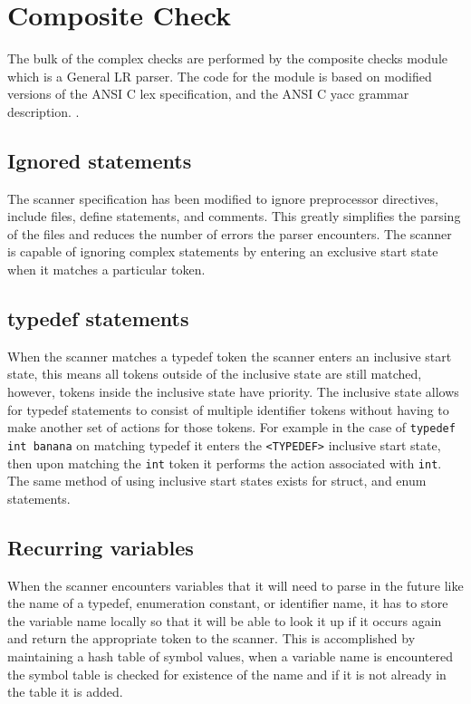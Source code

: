 \section{Composite Check}

The bulk of the complex checks are performed by the composite checks module 
which is a General LR parser. The code for the module is based on modified 
versions of the ANSI C lex specification, and the ANSI C yacc grammar 
description. \citep{ANSI}.

\subsection{Ignored statements}
The scanner specification has been modified to 
ignore preprocessor directives, include files, define statements, and comments.
This greatly simplifies the parsing of the files and reduces the number of 
errors the parser encounters. The scanner is capable of ignoring complex 
statements by entering an exclusive start state when it matches a particular
token.

\subsection{typedef statements}
When the scanner matches a typedef token the scanner enters an inclusive start
state, this means all tokens outside of the inclusive state are still matched,
however, tokens inside the inclusive state have priority. The inclusive state 
allows for typedef statements to consist of multiple identifier tokens without 
having to make another set of actions for those tokens. For example in the case
of \texttt{typedef int banana} on matching typedef it enters the 
\verb|<TYPEDEF>| inclusive start state, then upon matching the \texttt{int} 
token it performs the action associated with \texttt{int}. The same method of 
using inclusive start states exists for struct, and enum statements.

\subsection{Recurring variables}
When the scanner encounters variables that it will need to parse in the future 
like the name of a typedef, enumeration constant, or identifier name, it has to
store the variable name locally so that it will be able to look it up if it 
occurs again and return the appropriate token to the scanner. This is 
accomplished by maintaining a hash table of symbol values, when a variable name
is encountered the symbol table is checked for existence of the name and if it 
is not already in the table it is added.

